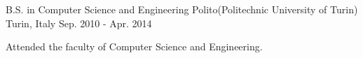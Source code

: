 

\begin{cventries}

  \cventry
    {B.S. in Computer Science and Engineering} %
    {Polito(Politechnic University of Turin)} %
    {Turin, Italy} %
    {Sep. 2010 - Apr. 2014} %
    {
      \begin{cvitems} %
        \item {Attended the faculty of Computer Science and Engineering.}
      \end{cvitems}
    }

\end{cventries}
